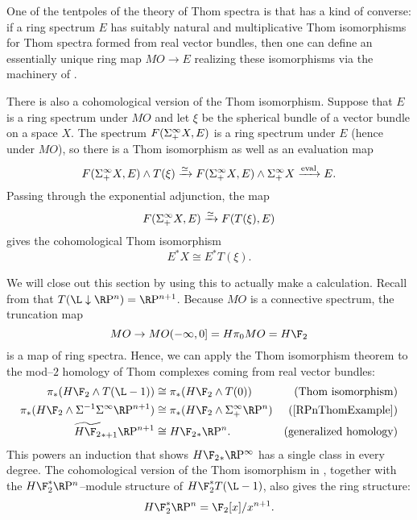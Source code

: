 \begin{remark}
One of the tentpoles of the theory of Thom spectra is that  has a kind of converse: if a ring spectrum $E$ has suitably natural and multiplicative Thom isomorphisms for Thom spectra formed from real vector bundles, then one can define an essentially unique ring map $MO \to E$ realizing these isomorphisms via the machinery of .
\end{remark}

\begin{remark}\label{CohomologicalThomIso}
There is also a cohomological version of the Thom isomorphism.  Suppose that $E$ is a ring spectrum under $MO$ and let $\xi$ be the spherical bundle of a vector bundle on a space $X$.  The spectrum $F(\Sigma^\infty_+ X, E)$ is a ring spectrum under $E$ (hence under $MO$), so there is a Thom isomorphism as well as an evaluation map \[F(\Sigma^\infty_+ X, E) \wedge T(\xi) \xrightarrow{\simeq} F(\Sigma^\infty_+ X, E) \wedge \Sigma^\infty_+ X \xrightarrow{\operatorname{eval}} E.\]  Passing through the exponential adjunction, the map \[F(\Sigma^\infty_+ X, E) \xrightarrow{\simeq} F(T(\xi), E)\] gives the cohomological Thom isomorphism \[E^* X \cong E^* T(\xi).\]
\end{remark}

\begin{example}\label{HF2RPinftyExample}
We will close out this section by using this to actually make a calculation. Recall from  that $T(\L \downarrow \RP^n) = \RP^{n+1}$.  Because $MO$ is a connective spectrum, the truncation map \[MO \to MO(-\infty, 0] = H\pi_0 MO = H\F_2\] is a map of ring spectra.  Hence, we can apply the Thom isomorphism theorem to the mod--$2$ homology of Thom complexes coming from real vector bundles:
\begin{align*}
\pi_* (H\F_2 \sm T(\L - 1)) & \cong \pi_* (H\F_2 \sm T(0)) & \text{(Thom isomorphism)} \\
\pi_* (H\F_2 \sm \Susp^{-1} \Susp^\infty \RP^{n+1}) & \cong \pi_* (H\F_2 \sm \Susp^\infty_+ \RP^n) & \text{(\Cref{RPnThomExample})} \\
\widetilde{H\F_2}_{*+1} \RP^{n+1} & \cong H\F_2{}_* \RP^n. & \text{(generalized homology)}
\end{align*}
This powers an induction that shows $H\F_2{}_* \RP^\infty$ has a single class in every degree.  The cohomological version of the Thom isomorphism in , together with the $H\F_2^* \RP^n$--module structure of $H\F_2^* T(\L-1)$, also gives the ring structure: \[H\F_2^* \RP^n = \F_2[x] / x^{n+1}.\]
\end{example}






